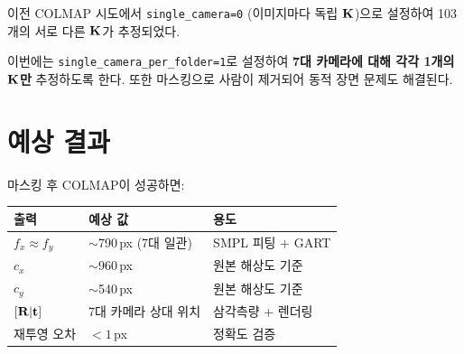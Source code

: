 \documentclass[11pt, a4paper]{report}
\theoremstyle{definition}
\theoremstyle{remark}
\begin{document}
\begin{importantnote}
이전 COLMAP 시도에서 \texttt{single\_camera=0} (이미지마다 독립 $\mathbf{K}$)으로 설정하여
103개의 서로 다른 $\mathbf{K}$가 추정되었다.

이번에는 \texttt{single\_camera\_per\_folder=1}로 설정하여
\textbf{7대 카메라에 대해 각각 1개의 $\mathbf{K}$만} 추정하도록 한다.
또한 마스킹으로 사람이 제거되어 동적 장면 문제도 해결된다.
\end{importantnote}


\section{예상 결과}

마스킹 후 COLMAP이 성공하면:

\begin{table}[H]
\centering
\renewcommand{\arraystretch}{1.3}
\begin{tabular}{lll}
\toprule
\textbf{출력} & \textbf{예상 값} & \textbf{용도} \\
\midrule
$f_x \approx f_y$ & $\sim$790\,px (7대 일관) & SMPL 피팅 + GART \\
$c_x$ & $\sim$960\,px & 원본 해상도 기준 \\
$c_y$ & $\sim$540\,px & 원본 해상도 기준 \\
$[\mathbf{R}|\mathbf{t}]$ & 7대 카메라 상대 위치 & 삼각측량 + 렌더링 \\
재투영 오차 & $< 1$\,px & 정확도 검증 \\
\bottomrule
\end{tabular}
\end{table}
\end{document}
